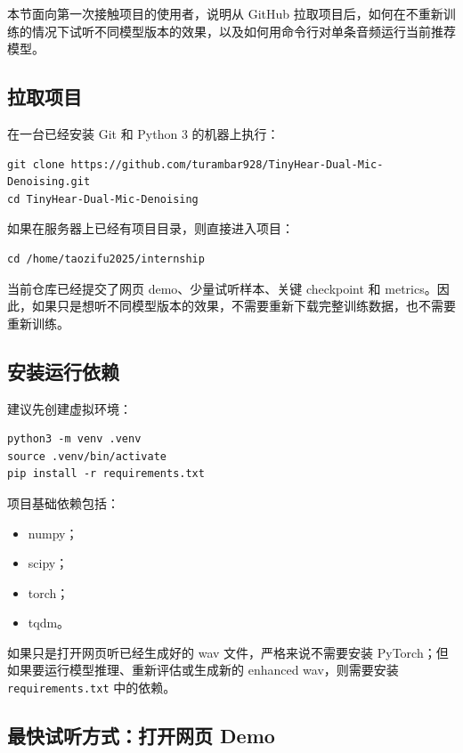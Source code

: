 \documentclass[UTF8,12pt,a4paper]{ctexart}
\begin{document}
本节面向第一次接触项目的使用者，说明从 GitHub 拉取项目后，如何在不重新训练的情况下试听不同模型版本的效果，以及如何用命令行对单条音频运行当前推荐模型。

\subsection{拉取项目}

在一台已经安装 Git 和 Python 3 的机器上执行：

\begin{lstlisting}
git clone https://github.com/turambar928/TinyHear-Dual-Mic-Denoising.git
cd TinyHear-Dual-Mic-Denoising
\end{lstlisting}

如果在服务器上已经有项目目录，则直接进入项目：

\begin{lstlisting}
cd /home/taozifu2025/internship
\end{lstlisting}

当前仓库已经提交了网页 demo、少量试听样本、关键 checkpoint 和 metrics。因此，如果只是想听不同模型版本的效果，不需要重新下载完整训练数据，也不需要重新训练。

\subsection{安装运行依赖}

建议先创建虚拟环境：

\begin{lstlisting}
python3 -m venv .venv
source .venv/bin/activate
pip install -r requirements.txt
\end{lstlisting}

项目基础依赖包括：

\begin{itemize}
  \item numpy；
  \item scipy；
  \item torch；
  \item tqdm。
\end{itemize}

如果只是打开网页听已经生成好的 wav 文件，严格来说不需要安装 PyTorch；但如果要运行模型推理、重新评估或生成新的 enhanced wav，则需要安装 \texttt{requirements.txt} 中的依赖。

\subsection{最快试听方式：打开网页 Demo}
\end{document}
